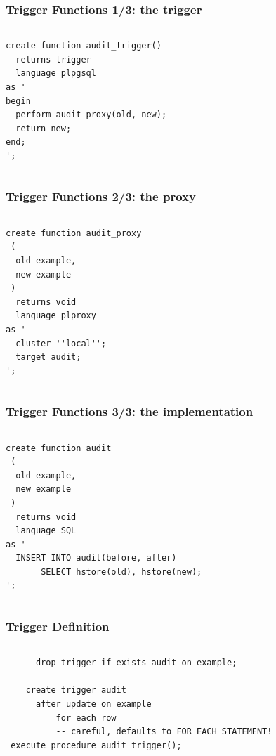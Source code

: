 \documentclass{beamer}
\begin{document}
\begin{frame}[fragile]
  \frametitle{Trigger Functions 1/3: the trigger}

\begin{columns}
\begin{verbatim}
create function audit_trigger()
  returns trigger
  language plpgsql
as '
begin
  perform audit_proxy(old, new);
  return new;
end;
';
\end{verbatim}
\end{columns}
\end{frame}

\begin{frame}[fragile]
  \frametitle{Trigger Functions 2/3: the proxy}

\begin{columns}
\begin{verbatim}
create function audit_proxy
 (
  old example,
  new example
 )
  returns void
  language plproxy
as '
  cluster ''local'';
  target audit;
';
\end{verbatim}
\end{columns}
\end{frame}

\begin{frame}[fragile]
  \frametitle{Trigger Functions 3/3: the implementation}

\begin{columns}
\begin{verbatim}
create function audit
 (
  old example,
  new example
 )
  returns void
  language SQL
as '
  INSERT INTO audit(before, after)
       SELECT hstore(old), hstore(new);   
';
\end{verbatim}  
\end{columns}
\end{frame}

\begin{frame}[fragile]
  \frametitle{Trigger Definition}

\begin{columns}
\begin{verbatim}
      drop trigger if exists audit on example;

    create trigger audit
      after update on example
          for each row
          -- careful, defaults to FOR EACH STATEMENT!
 execute procedure audit_trigger();
\end{verbatim}  
\end{columns}
\end{frame}
\end{document}
